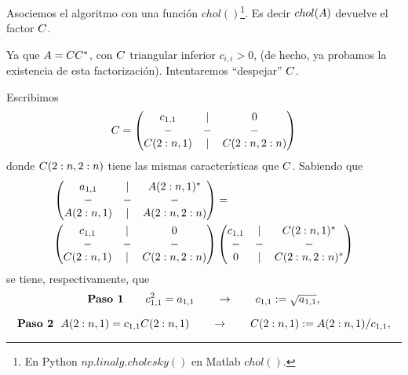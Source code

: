 \begin{tcolorbox}
Asociemos el algoritmo con una función $chol()$\footnote{En Python $np.linalg.cholesky()$ en Matlab $chol()$.}. Es decir $chol(\Ab)$ devuelve el factor $\Cb$.

Ya que $\Ab=\Cb\Cb^*$, con $\Cb$ triangular inferior $c_{i,i}>0$, (de hecho, ya probamos la existencia de esta factorización). Intentaremos ``despejar'' $\Cb$.

Escribimos
$$
\Cb=
\begin{pmatrix}
 c_{1,1}&|&\cero \\
 -&-&-\\
 \Cb(2:n,1)&|&\Cb(2:n,2:n)
\end{pmatrix}
$$
donde $\Cb(2:n,2:n)$ tiene las mismas características que $\Cb$. Sabiendo que
\begin{eqnarray}
\label{eq:desc_de_A_:w
Chol}
\begin{pmatrix}
 a_{1,1}&|&\Ab(2:n,1)^* \\
 -&-&-\\
 \Ab(2:n,1)&|&\Ab(2:n,2:n)
\end{pmatrix}&= \\ \nonumber
\begin{pmatrix}
 c_{1,1}&|&\cero \\
 -&-&-\\
 \Cb(2:n,1)&|&\Cb(2:n,2:n)
\end{pmatrix}
&
\begin{pmatrix}
 c_{1,1}&|&\Cb(2:n,1)^* \\
 -&-&-\\
 \cero&|&\Cb(2:n,2:n)^*
\end{pmatrix}
\end{eqnarray}
se tiene, respectivamente, que
$$
\mbox{\bf Paso 1}  \qquad c_{1,1}^2=a_{1,1} \qquad \to \qquad c_{1,1}:=\sqrt{a_{1,1}},
$$

$$
\mbox{\bf Paso 2} \ \  \Ab(2:n,1)=c_{1,1}\Cb(2:n,1)\qquad\to\qquad \Cb(2:n,1):=\Ab(2:n,1)/c_{1,1},
$$


\end{tcolorbox}

